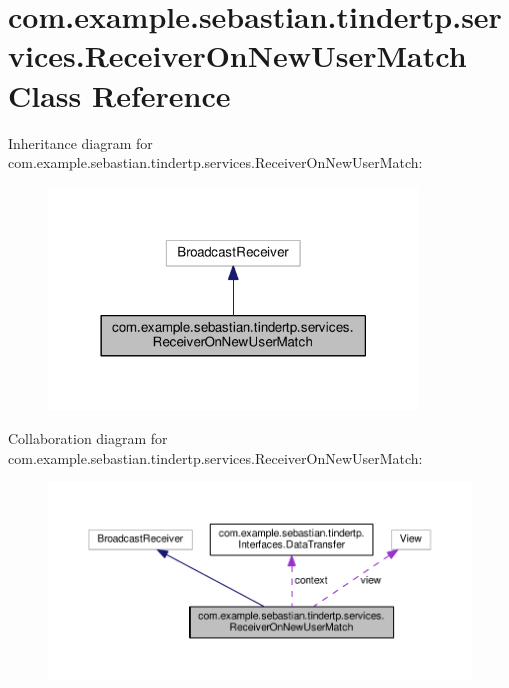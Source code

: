 \hypertarget{classcom_1_1example_1_1sebastian_1_1tindertp_1_1services_1_1ReceiverOnNewUserMatch}{}\section{com.\+example.\+sebastian.\+tindertp.\+services.\+Receiver\+On\+New\+User\+Match Class Reference}
\label{classcom_1_1example_1_1sebastian_1_1tindertp_1_1services_1_1ReceiverOnNewUserMatch}


Inheritance diagram for com.\+example.\+sebastian.\+tindertp.\+services.\+Receiver\+On\+New\+User\+Match\+:\nopagebreak
\begin{figure}[H]
\begin{center}
\leavevmode
\includegraphics[width=278pt]{classcom_1_1example_1_1sebastian_1_1tindertp_1_1services_1_1ReceiverOnNewUserMatch__inherit__graph}
\end{center}
\end{figure}


Collaboration diagram for com.\+example.\+sebastian.\+tindertp.\+services.\+Receiver\+On\+New\+User\+Match\+:
\nopagebreak
\begin{figure}[H]
\begin{center}
\leavevmode
\includegraphics[width=350pt]{classcom_1_1example_1_1sebastian_1_1tindertp_1_1services_1_1ReceiverOnNewUserMatch__coll__graph}
\end{center}
\end{figure}
